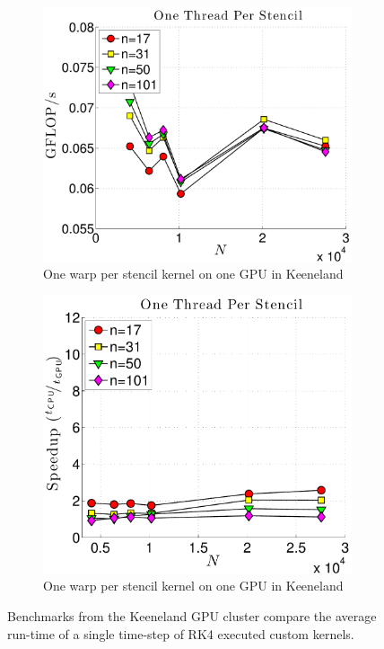 \begin{figure}
\begin{subfigure}[t]{0.425\textwidth}
\includegraphics[width=1.0\textwidth]{../figures/keeneland_results/alltoallv/gflops_gpu_1proc_oneThreadPerStencil-eps-converted-to.pdf}
\caption{One warp per stencil kernel on one GPU in Keeneland}
\label{fig:gflops_gpu_1proc_oneThread_keeneland}
\end{subfigure}
\begin{subfigure}[t]{0.425\textwidth}
\includegraphics[width=1.0\textwidth]{../figures/keeneland_results/alltoallv/speedup_1proc_oneThreadPerStencil-eps-converted-to.pdf}
\caption{One warp per stencil kernel on one GPU in Keeneland}
\label{fig:speedup_1proc_oneThread_keeneland}
\end{subfigure} 
\caption{Benchmarks from the Keeneland GPU cluster compare the average run-time of a single time-step of RK4 executed custom kernels.}
\end{figure} 

